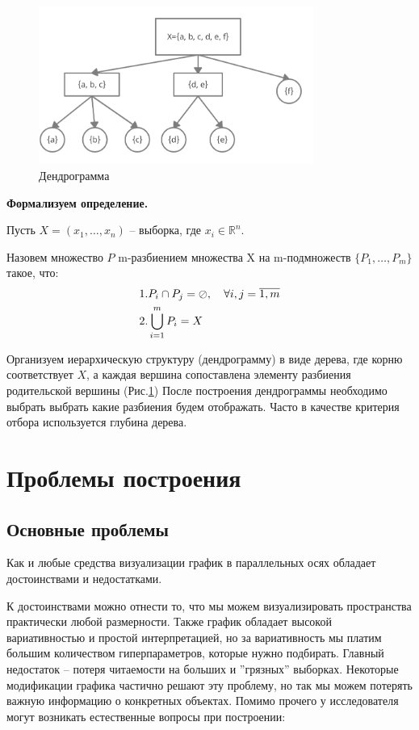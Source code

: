 \documentclass[12pt,fleqn]{article}
\begin{document}
\begin{figure}[htb]
    \centering
    \includegraphics[width=9cm]{hierarchical_graph.png}
    \caption{Дендрограмма}
    \label{hierarchical_partition}
\end{figure}


\noindent \large \textbf{Формализуем определение.}

\vspace{10pt}

\noindent Пусть $X=(x_1,\ldots,x_n)$ -- выборка, где $x_i\in \mathbb{R}^n$. 

\noindent Назовем множество $P$ m-разбиением множества X на m-подмножеств $\{P_1,\ldots,P_m\}$
такое, что:
\begin{align}
    \notag &1. P_i \cap  P_j = \oslash, \hspace{10px} \forall i,j =\overline{1,m} \\
    \notag &2. \bigcup\limits_{i=1}^{m} P_i = X 
\end{align}

\noindent Организуем иерархическую структуру (дендрограмму) в виде дерева, где корню соответствует $X$, 
а каждая вершина сопоставлена элементу разбиения родительской вершины (Рис.\ref{hierarchical_partition})
После построения дендрограммы необходимо выбрать выбрать какие разбиения будем отображать. 
Часто в качестве критерия отбора используется глубина дерева.

\section{Проблемы построения}

\subsection{Основные проблемы}
Как и любые средства визуализации график в параллельных осях обладает достоинствами и недостатками.

К достоинствами можно отнести то, что мы можем визуализировать пространства практически
любой размерности. Также график обладает высокой вариативностью и простой интерпретацией, но за
вариативность мы платим большим количеством гиперпараметров, которые нужно подбирать. 
Главный недостаток -- потеря читаемости на больших и ''грязных'' выборках. 
Некоторые модификации графика частично решают эту проблему, но так мы можем потерять важную информацию о конкретных объектах.
Помимо прочего у исследователя могут возникать естественные вопросы при построении:
\end{document}

